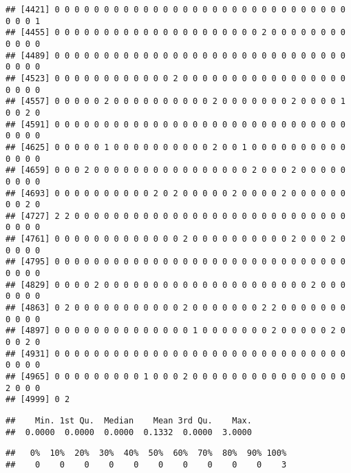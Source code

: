 \documentclass[12pt,]{article}
\newenvironment{Shaded}{\begin{snugshade}}{\end{snugshade}}
\newcommand{\DecValTok}[1]{\textcolor[rgb]{0.00,0.00,0.81}{#1}}
\newcommand{\FloatTok}[1]{\textcolor[rgb]{0.00,0.00,0.81}{#1}}
\newcommand{\KeywordTok}[1]{\textcolor[rgb]{0.13,0.29,0.53}{\textbf{#1}}}
\newcommand{\NormalTok}[1]{#1}
\newcommand{\OperatorTok}[1]{\textcolor[rgb]{0.81,0.36,0.00}{\textbf{#1}}}
\begin{document}
\begin{verbatim}
## [4421] 0 0 0 0 0 0 0 0 0 0 0 0 0 0 0 0 0 0 0 0 0 0 0 0 0 0 0 0 0 0 0 0 0 1
## [4455] 0 0 0 0 0 0 0 0 0 0 0 0 0 0 0 0 0 0 0 0 0 2 0 0 0 0 0 0 0 0 0 0 0 0
## [4489] 0 0 0 0 0 0 0 0 0 0 0 0 0 0 0 0 0 0 0 0 0 0 0 0 0 0 0 0 0 0 0 0 0 0
## [4523] 0 0 0 0 0 0 0 0 0 0 0 0 2 0 0 0 0 0 0 0 0 0 0 0 0 0 0 0 0 0 0 0 0 0
## [4557] 0 0 0 0 0 2 0 0 0 0 0 0 0 0 0 0 2 0 0 0 0 0 0 0 2 0 0 0 0 1 0 0 2 0
## [4591] 0 0 0 0 0 0 0 0 0 0 0 0 0 0 0 0 0 0 0 0 0 0 0 0 0 0 0 0 0 0 0 0 0 0
## [4625] 0 0 0 0 0 1 0 0 0 0 0 0 0 0 0 0 2 0 0 1 0 0 0 0 0 0 0 0 0 0 0 0 0 0
## [4659] 0 0 0 2 0 0 0 0 0 0 0 0 0 0 0 0 0 0 0 0 2 0 0 0 2 0 0 0 0 0 0 0 0 0
## [4693] 0 0 0 0 0 0 0 0 0 0 2 0 2 0 0 0 0 0 2 0 0 0 0 2 0 0 0 0 0 0 0 0 2 0
## [4727] 2 2 0 0 0 0 0 0 0 0 0 0 0 0 0 0 0 0 0 0 0 0 0 0 0 0 0 0 0 0 0 0 0 0
## [4761] 0 0 0 0 0 0 0 0 0 0 0 0 0 2 0 0 0 0 0 0 0 0 0 0 2 0 0 0 2 0 0 0 0 0
## [4795] 0 0 0 0 0 0 0 0 0 0 0 0 0 0 0 0 0 0 0 0 0 0 0 0 0 0 0 0 0 0 0 0 0 0
## [4829] 0 0 0 0 2 0 0 0 0 0 0 0 0 0 0 0 0 0 0 0 0 0 0 0 0 0 2 0 0 0 0 0 0 0
## [4863] 0 2 0 0 0 0 0 0 0 0 0 0 0 2 0 0 0 0 0 0 0 2 2 0 0 0 0 0 0 0 0 0 0 0
## [4897] 0 0 0 0 0 0 0 0 0 0 0 0 0 0 1 0 0 0 0 0 0 0 2 0 0 0 0 0 2 0 0 0 2 0
## [4931] 0 0 0 0 0 0 0 0 0 0 0 0 0 0 0 0 0 0 0 0 0 0 0 0 0 0 0 0 0 0 0 0 0 0
## [4965] 0 0 0 0 0 0 0 0 0 1 0 0 0 2 0 0 0 0 0 0 0 0 0 0 0 0 0 0 0 0 2 0 0 0
## [4999] 0 2
\end{verbatim}

\begin{Shaded}
\end{Shaded}

\begin{verbatim}
##    Min. 1st Qu.  Median    Mean 3rd Qu.    Max. 
##  0.0000  0.0000  0.0000  0.1332  0.0000  3.0000
\end{verbatim}

\begin{Shaded}
\end{Shaded}

\begin{verbatim}
##   0%  10%  20%  30%  40%  50%  60%  70%  80%  90% 100% 
##    0    0    0    0    0    0    0    0    0    0    3
\end{verbatim}
\end{document}

